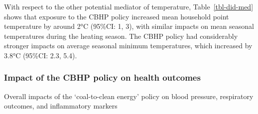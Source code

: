 \documentclass[
  letterpaper,
  DIV=11,
  numbers=noendperiod]{scrartcl}
\makeatletter
\renewenvironment{table}%
   {\renewcommand\familydefault\sfdefault
    \@float{table}}
   {\end@float}
\makeatother
\begin{document}
With respect to the other potential mediator of temperature,
Table~\ref{tbl-did-med} shows that exposure to the CBHP policy increased
mean household point temperature by around 2°C (95\%CI: 1, 3), with
similar impacts on mean seasonal temperatures during the heating season.
The CBHP policy had considerably stronger impacts on average seasonal
minimum temperatures, which increased by 3.8°C (95\%CI: 2.3, 5.4).

\subsubsection{Impact of the CBHP policy on health
outcomes}\label{impact-of-the-cbhp-policy-on-health-outcomes}

\begin{table}

\caption{\label{tbl-did-health}Overall impacts of the `coal-to-clean
energy' policy on blood pressure, respiratory outcomes, and inflammatory
markers}

\centering{

}
\end{table}
\end{document}
